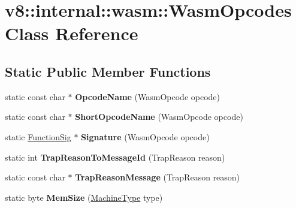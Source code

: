 \hypertarget{classv8_1_1internal_1_1wasm_1_1_wasm_opcodes}{}\section{v8\+:\+:internal\+:\+:wasm\+:\+:Wasm\+Opcodes Class Reference}
\label{classv8_1_1internal_1_1wasm_1_1_wasm_opcodes}
\subsection*{Static Public Member Functions}
\begin{DoxyCompactItemize}
\item 
static const char $\ast$ {\bfseries Opcode\+Name} (Wasm\+Opcode opcode)\hypertarget{classv8_1_1internal_1_1wasm_1_1_wasm_opcodes_a0c0eac2b7fad842c77c26675d2823a37}{}\label{classv8_1_1internal_1_1wasm_1_1_wasm_opcodes_a0c0eac2b7fad842c77c26675d2823a37}

\item 
static const char $\ast$ {\bfseries Short\+Opcode\+Name} (Wasm\+Opcode opcode)\hypertarget{classv8_1_1internal_1_1wasm_1_1_wasm_opcodes_a2b44430c075441acc6a28cbbbc3b5a2a}{}\label{classv8_1_1internal_1_1wasm_1_1_wasm_opcodes_a2b44430c075441acc6a28cbbbc3b5a2a}

\item 
static \hyperlink{classv8_1_1internal_1_1_signature}{Function\+Sig} $\ast$ {\bfseries Signature} (Wasm\+Opcode opcode)\hypertarget{classv8_1_1internal_1_1wasm_1_1_wasm_opcodes_a48fb737c1a020d4d55183e679570c11e}{}\label{classv8_1_1internal_1_1wasm_1_1_wasm_opcodes_a48fb737c1a020d4d55183e679570c11e}

\item 
static int {\bfseries Trap\+Reason\+To\+Message\+Id} (Trap\+Reason reason)\hypertarget{classv8_1_1internal_1_1wasm_1_1_wasm_opcodes_ab4844e60ad6a0db6217dbadc7f67cdde}{}\label{classv8_1_1internal_1_1wasm_1_1_wasm_opcodes_ab4844e60ad6a0db6217dbadc7f67cdde}

\item 
static const char $\ast$ {\bfseries Trap\+Reason\+Message} (Trap\+Reason reason)\hypertarget{classv8_1_1internal_1_1wasm_1_1_wasm_opcodes_abfd15710274ea846e76b5fc80d41a927}{}\label{classv8_1_1internal_1_1wasm_1_1_wasm_opcodes_abfd15710274ea846e76b5fc80d41a927}

\item 
static byte {\bfseries Mem\+Size} (\hyperlink{classv8_1_1internal_1_1_machine_type}{Machine\+Type} type)\hypertarget{classv8_1_1internal_1_1wasm_1_1_wasm_opcodes_a863834be905702aae57a20b5ec677486}{}\label{classv8_1_1internal_1_1wasm_1_1_wasm_opcodes_a863834be905702aae57a20b5ec677486}


\end{DoxyCompactItemize}
